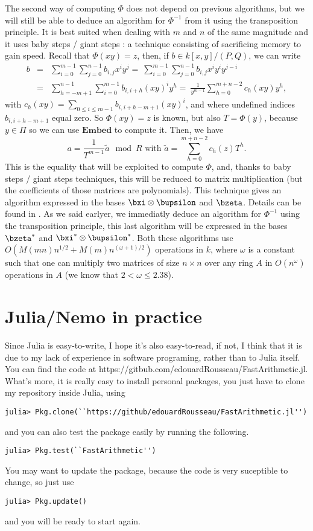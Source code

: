 \documentclass[a4paper,11pt]{article}
\theoremstyle{break}
\theoremstyle{definition}
\theoremstyle{remark}
\begin{document}
The second way of computing $\Phi$ does not depend on previous algorithms, but 
we will still be able to deduce an algorithm for $\Phi^{-1}$ from it using the 
transposition principle. It is best suited when dealing with $m$ and $n$ of the 
same magnitude and it uses baby steps / giant steps : a technique consisting of 
sacrificing memory to gain speed. Recall that $\Phi(xy)=z$, then, if $b\in 
k[x,y]/(P,Q)$, we can write
\begin{eqnarray*}
b&=&\sum_{i=0}^{m-1}\sum_{j=0}^{n-1} b_{i,j}x^i y^j
=~\sum_{i=0}^{m-1}\sum_{j=0}^{n-1} b_{i,j}x^i y^i y^{j-i}\\
&=&\sum_{h=-m+1}^{n-1}\sum_{i=0}^{m-1} b_{i,i+h}(xy)^i y^h
=~\frac{1}{y^{m-1}} \sum_{h=0}^{m+n-2} c_h(xy) y^h,
\end{eqnarray*}
with $c_h(xy)=\sum_{0 \leq i \leq m-1} b_{i,i+h-m+1} (xy)^i$, and where 
undefined indices $b_{i,i+h-m+1}$ equal zero. So $\Phi(xy)=z$ is known, but 
also $T=\Phi(y)$, because $y\in\Pi$ so we can use $\textbf{Embed}$ to compute 
it. Then, we have 
\[
a = \frac{1}{T^{m-1}}\tilde a \mod R \text{ with } \tilde a = \sum_{h=0}^{m+n-2} 
c_h(z) T^h.
\]
This is the equality that will be exploited to compute $\Phi$, and, thanks to 
baby steps / giant steps techniques, this will be reduced to matrix 
multiplication (but the coefficients of those matrices are polynomials). This 
technique gives an algorithm expressed in the bases $\bxi\otimes\bupsilon$ and 
$\bzeta$. Details can be found in \cite{DeDoSc14}. As we said earlyer, we 
immediatly deduce an algorithm for $\Phi^{-1}$ using the 
transposition principle, this last algorithm will be expressed in the bases 
$\bzeta^*$ and $\bxi^*\otimes\bupsilon^*$. Both these algorithms use 
$O(M(mn)n^{1/2}+M(m)n^{(\omega+1)/2})$ operations in $k$, where $\omega$ is a 
constant such that one can multiply two matrices of size $n\times n$ over any 
ring $A$ in $O(n^\omega)$ operations in $A$ (we know that $2 < \omega \leq 
2.38$).


\section{Julia/Nemo in practice}
Since Julia is easy-to-write, I hope it's also
easy-to-read, if not, I think that it is due to my lack of experience in
software programing, rather than to Julia itself. You can find the code
at
https://gitbub.com/edouardRousseau/FastArithmetic.jl. What's more, it is really
easy to install personal packages, you just have to clone my repository
inside Julia, using
\begin{verbatim}
julia> Pkg.clone(``https://github/edouardRousseau/FastArithmetic.jl'') 
\end{verbatim}
and you can also test the package easily by running the following.
\begin{verbatim}
julia> Pkg.test(``FastArithmetic'') 
\end{verbatim}
You may want to update the package, because the code is very suceptible to 
change, so just use
\begin{verbatim}
julia> Pkg.update()
\end{verbatim}
and you will be ready to start again. 
\end{document}
